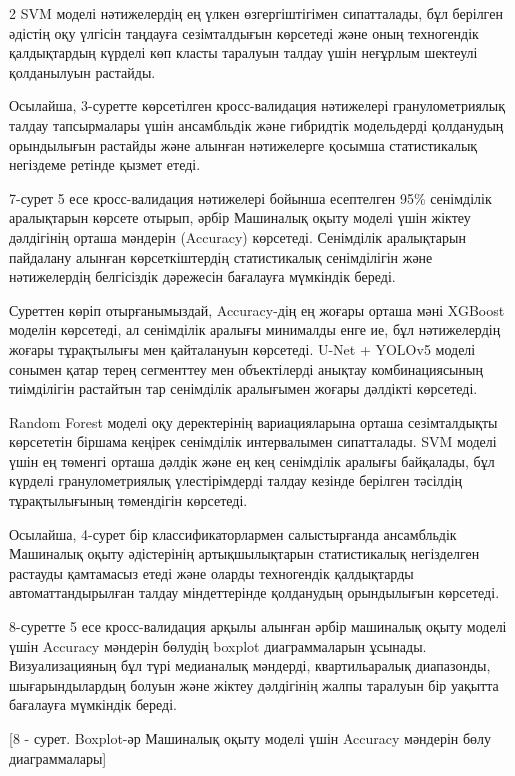 \begin{multicols}{2}
SVM моделі нәтижелердің ең үлкен өзгергіштігімен сипатталады, бұл
берілген әдістің оқу үлгісін таңдауға сезімталдығын көрсетеді және оның
техногендік қалдықтардың күрделі көп класты таралуын талдау үшін
неғұрлым шектеулі қолданылуын растайды.

Осылайша, 3-суретте көрсетілген кросс-валидация нәтижелері
гранулометриялық талдау тапсырмалары үшін ансамбльдік және гибридтік
модельдерді қолданудың орындылығын растайды және алынған нәтижелерге
қосымша статистикалық негіздеме ретінде қызмет етеді.

7-сурет 5 есе кросс-валидация нәтижелері бойынша есептелген 95\%
сенімділік аралықтарын көрсете отырып, әрбір Машиналық оқыту моделі үшін
жіктеу дәлдігінің орташа мәндерін (Accuracy) көрсетеді. Сенімділік
аралықтарын пайдалану алынған көрсеткіштердің статистикалық сенімділігін
және нәтижелердің белгісіздік дәрежесін бағалауға мүмкіндік береді.

Суреттен көріп отырғанымыздай, Accuracy-дің ең жоғары орташа мәні
XGBoost моделін көрсетеді, ал сенімділік аралығы минималды енге ие, бұл
нәтижелердің жоғары тұрақтылығы мен қайталануын көрсетеді. U-Net +
YOLOv5 моделі сонымен қатар терең сегменттеу мен объектілерді анықтау
комбинациясының тиімділігін растайтын тар сенімділік аралығымен жоғары
дәлдікті көрсетеді.

Random Forest моделі оқу деректерінің вариацияларына орташа
сезімталдықты көрсететін біршама кеңірек сенімділік интервалымен
сипатталады. SVM моделі үшін ең төменгі орташа дәлдік және ең кең
сенімділік аралығы байқалады, бұл күрделі гранулометриялық
үлестірімдерді талдау кезінде берілген тәсілдің тұрақтылығының
төмендігін көрсетеді.

Осылайша, 4-сурет бір классификаторлармен салыстырғанда ансамбльдік
Машиналық оқыту әдістерінің артықшылықтарын статистикалық негізделген
растауды қамтамасыз етеді және оларды техногендік қалдықтарды
автоматтандырылған талдау міндеттерінде қолданудың орындылығын
көрсетеді.

8-суретте 5 есе кросс-валидация арқылы алынған әрбір машиналық оқыту
моделі үшін Accuracy мәндерін бөлудің boxplot диаграммаларын ұсынады.
Визуализацияның бұл түрі медианалық мәндерді, квартильаралық диапазонды,
шығарындылардың болуын және жіктеу дәлдігінің жалпы таралуын бір уақытта
бағалауға мүмкіндік береді.
\end{multicols}

[8 - сурет. Boxplot-әр Машиналық оқыту моделі үшін Accuracy
мәндерін бөлу диаграммалары]

